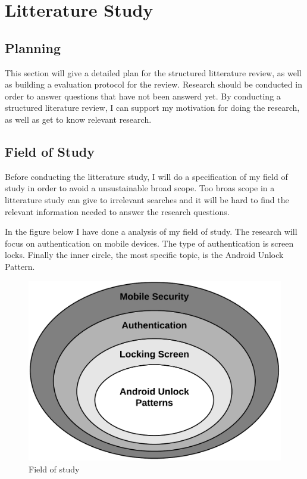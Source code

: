 
\chapter{Litterature Study}
  \section{Planning}
    This section will give a detailed plan for the structured litterature review, as well as building a 
    evaluation protocol for the review. 
    Research should be conducted in order to answer questions that have not been answerd yet. 
    By conducting a structured literature review, I can support my motivation for doing the research, 
    as well as get to know relevant research. 

    \section{Field of Study}
    Before conducting the litterature study, I will do a specification of my field of study in order to
    avoid a unsustainable broad scope. Too broas scope in a litterature study can give to irrelevant searches 
    and it will be hard to find the relevant information needed to answer the research questions. 

    In the figure below I have done a analysis of my field of study. The research will focus on authentication on mobile devices. 
    The type of authentication is screen locks. Finally the inner circle, the most specific topic, is the Android Unlock Pattern. 

    \begin{figure}[H]
    \centering
    \includegraphics[scale=0.25]{pics/Fieldofstudy.png}
    \caption{Field of study}
    \end{figure}

